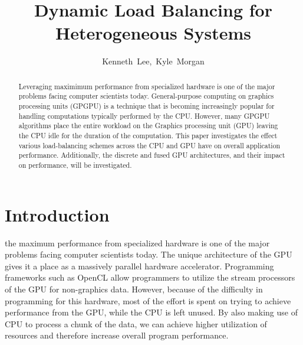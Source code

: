 \documentclass[journal]{IEEEtran}
\begin{document}
\title{Dynamic Load Balancing for\\Heterogeneous Systems}

\author{Kenneth~Lee,~Kyle~Morgan}%


\maketitle

\begin{abstract}
Leveraging maximimum performance from specialized hardware is one of the
major problems facing computer scientists today.  General-purpose computing
on graphics processing units (GPGPU) is a technique that is becoming
increasingly popular for handling computations typically performed by the
CPU.  However, many GPGPU algorithms place the entire workload on the Graphics
processing unit (GPU) leaving the CPU idle for the duration of the computation.
This paper investigates the effect various load-balancing schemes across the CPU
and GPU have on overall application performance.  Additionally, the discrete and
fused GPU architectures, and their impact on performance, will be investigated.
\end{abstract}

\section{Introduction}
% 
% 
% 
 the maximum performance from specialized hardware is one
of the major problems facing computer scientists today.  The unique architecture of the
GPU gives it a place as a massively parallel hardware accelerator.  Programming frameworks
such as OpenCL allow programmers to utilize the stream processors of the GPU for non-graphics
data.  However, because of the difficulty in programming for this hardware, most of the
effort is spent on trying to achieve performance from the GPU, while the CPU is left
unused.  By also making use of CPU to process a chunk of the data, we can achieve higher
utilization of resources and therefore increase overall program performance.
\end{document}
